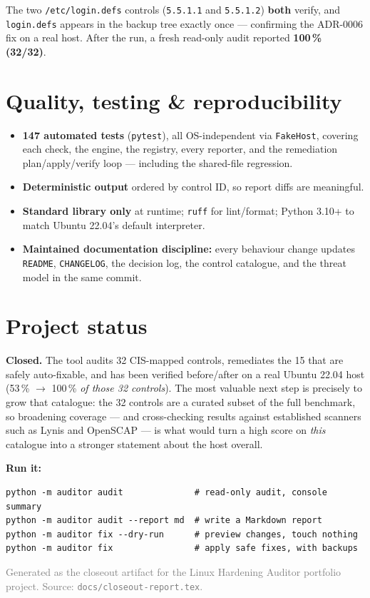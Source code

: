 \documentclass[11pt,a4paper]{article}
\begin{document}
\noindent The two \texttt{/etc/login.defs} controls (\texttt{5.5.1.1} and \texttt{5.5.1.2})
\textbf{both} verify, and \texttt{login.defs} appears in the backup tree exactly once ---
confirming the ADR-0006 fix on a real host. After the run, a fresh read-only audit reported
\textbf{100\,\% (32/32)}.

\section{Quality, testing \& reproducibility}
\begin{itemize}
  \item \textbf{147 automated tests} (\texttt{pytest}), all OS-independent via \texttt{FakeHost},
        covering each check, the engine, the registry, every reporter, and the remediation
        plan/apply/verify loop --- including the shared-file regression.
  \item \textbf{Deterministic output} ordered by control ID, so report diffs are meaningful.
  \item \textbf{Standard library only} at runtime; \texttt{ruff} for lint/format; Python 3.10+
        to match Ubuntu 22.04's default interpreter.
  \item \textbf{Maintained documentation discipline:} every behaviour change updates
        \texttt{README}, \texttt{CHANGELOG}, the decision log, the control catalogue, and the
        threat model in the same commit.
\end{itemize}

\section{Project status}
\textbf{Closed.} The tool audits 32 CIS-mapped controls, remediates the 15 that are safely
auto-fixable, and has been verified before/after on a real Ubuntu 22.04 host (53\,\% $\rightarrow$
100\,\% \emph{of those 32 controls}). The most valuable next step is precisely to grow that
catalogue: the 32 controls are a curated subset of the full benchmark, so broadening coverage ---
and cross-checking results against established scanners such as Lynis and OpenSCAP --- is what
would turn a high score on \emph{this} catalogue into a stronger statement about the host overall.

\vspace{0.6em}
\noindent\textbf{Run it:}
\begin{lstlisting}[style=console]
python -m auditor audit              # read-only audit, console summary
python -m auditor audit --report md  # write a Markdown report
python -m auditor fix --dry-run      # preview changes, touch nothing
python -m auditor fix                # apply safe fixes, with backups
\end{lstlisting}

\vspace{0.4em}
\noindent\small\textcolor{gray}{Generated as the closeout artifact for the Linux Hardening
Auditor portfolio project. Source: \texttt{docs/closeout-report.tex}.}
\end{document}
